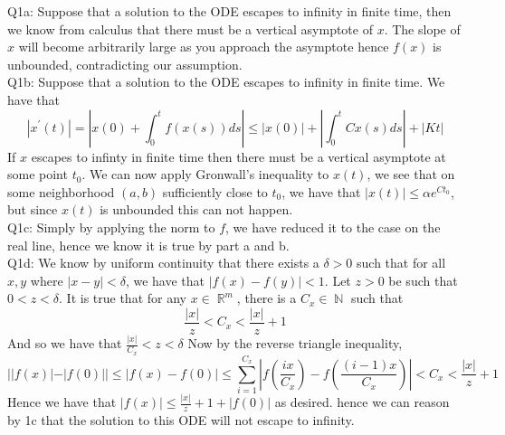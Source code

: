 \documentclass[letterpaper]{article}
\DeclareMathOperator{\R}{\mathbb{R}}
\DeclareMathOperator{\N}{\mathbb{N}}
\begin{document}
\noindent Q1a: Suppose that a solution to the ODE escapes to infinity in finite time, then we know from calculus that there must be a vertical asymptote of $x$. The slope of $x$ will become arbitrarily large as you approach the asymptote hence $f(x)$ is unbounded, contradicting our assumption. 
\newline \\ Q1b: Suppose that a solution to the ODE escapes to infinity in finite time. We have that $$|x^\prime(t)| = |x(0) + \int_{0}^t f(x(s))ds |\leq |x(0)| + |\int_{0}^t Cx(s)ds| + |Kt| $$ If $x$ escapes to infinty in finite time then there must be a vertical asymptote at some point $t_0$. We can now apply Gronwall's inequality to $x(t)$, we see that on some neighborhood $(a,b)$ sufficiently close to $t_0$, we have that $|x(t)|\leq \alpha e^{Ct_0}$, but since $x(t)$ is unbounded this can not happen. 
\newline \\ Q1c: Simply by applying the norm to $f$, we have reduced it to the case on the real line, hence we know it is true by part a and b. 
\newline \\ Q1d: We know by uniform continuity that there exists a $\delta>0$ such that for all $x,y$ where $|x-y|<\delta$, we have that $|f(x)-f(y)|<1$. Let $z>0$ be such that $0<z<\delta$. It is true that for any $x\in \R^m$, there is a $C_x\in \N$ such that $$\frac{|x|}{z}<C_x<\frac{|x|}{z}+1$$ And so we have that $\frac{|x|}{C_x}<z<\delta$ Now by the reverse triangle inequality, $$||f(x)|-|f(0)|| \leq |f(x)-f(0)| \leq \sum_{i=1}^{C_x} |f(\frac{ix}{C_x}) - f(\frac{(i-1)x}{C_x})| < C_x < \frac{|x|}{z}+1$$ 
Hence we have that $|f(x)| \leq \frac{|x|}{z}+1 + |f(0)|$ as desired. hence we can reason by 1c that the solution to this ODE will not escape to infinity.
\end{document}
